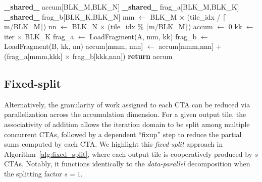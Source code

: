 \begin{algorithm}

    \footnotesize
    \caption{CTA-wide \lstinline{MacLoop()} subroutine for performing a sequence of MAC-loop iterations.}\label{alg:macloop}
    \begin{algorithmic}[1]
    \State \textbf{\_shared\_}  accum[BLK\_M,BLK\_N]
    \State \textbf{\_shared\_}  frag\_a[BLK\_M,BLK\_K]
    \State \textbf{\_shared\_}  frag\_b[BLK\_K,BLK\_N]
    \State mm $\gets$ BLK\_M $\times$ (tile\_idx / $\lceil$m/BLK\_M$\rceil$)
    \State nn $\gets$ BLK\_N $\times$ (tile\_idx \% $\lceil$m/BLK\_M$\rceil$)
    \State accum $\gets$ {0}
        \State kk $\gets$ iter $\times$ BLK\_K
        \State frag\_a $\gets$ LoadFragment(A, mm, kk) \State frag\_b $\gets$ LoadFragment(B, kk, nn)
                \State accum[mmm, nnn] $\gets$ accum[mmm,nnn] + 
                \State \quad (frag\_a[mmm,kkk] $\times$ frag\_b[kkk,nnn])
            \EndFor
        \EndFork \EndFor \State \textbf{return} accum \EndProcedure
    \end{algorithmic}
\end{algorithm}

\subsection{Fixed-split}
Alternatively, the granularity of work assigned to each CTA can be reduced via parallelization across the accumulation dimension. For a given output tile, the associativity of addition allows the iteration domain to be split among multiple concurrent CTAs, followed by a dependent ``fixup'' step to reduce the partial sums computed by each CTA\@. We highlight this \emph{fixed-split} approach in 
Algorithm~\ref{alg:fixed_split}, where each output tile is cooperatively produced by $s$ CTAs. Notably, it functions identically to the \emph{data-parallel} 
decomposition when the splitting factor $s = 1$.

